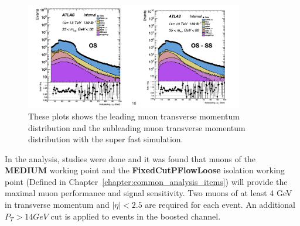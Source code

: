 \begin{figure}[!htb]
    \begin{center}
        \includegraphics[width=0.85\textwidth]{figures/chapter_dimuon/samesigned}
        \caption{
        These plots shows the leading muon transverse momentum distribution and the subleading muon transverse momentum distribution with the super fast simulation.  
        }
        \label{fig:samesigned}
    \end{center}
\end{figure}
\FloatBarrier

In the analysis, studies were done and it was found that muons of the \textbf{MEDIUM} working point and the \textbf{FixedCutPFlowLoose} isolation working point (Defined in Chapter~\ref{chapter:common_analysis_items}) will provide the maximal muon performance and signal sensitivity. Two muons of at least 4 GeV in transverse momentum and $|\eta|<2.5$ are required for each event. An additional $P_{T}> 14GeV$ cut is applied to events in the boosted channel.

